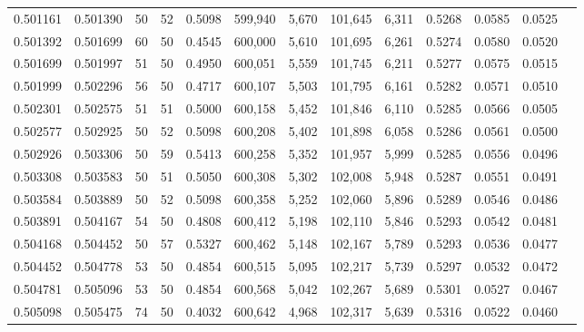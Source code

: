 \begin{tabular}{rrrrrrrrrrrrr}
0.501161 & 0.501390 &    50 &  52 &                                     0.5098 & 599,940 &   5,670 & 101,645 &   6,311 & 0.5268 & 0.0585 & 0.0525 \\
0.501392 & 0.501699 &    60 &  50 &                                     0.4545 & 600,000 &   5,610 & 101,695 &   6,261 & 0.5274 & 0.0580 & 0.0520 \\
0.501699 & 0.501997 &    51 &  50 &                                     0.4950 & 600,051 &   5,559 & 101,745 &   6,211 & 0.5277 & 0.0575 & 0.0515 \\
0.501999 & 0.502296 &    56 &  50 &                                     0.4717 & 600,107 &   5,503 & 101,795 &   6,161 & 0.5282 & 0.0571 & 0.0510 \\
0.502301 & 0.502575 &    51 &  51 &                                     0.5000 & 600,158 &   5,452 & 101,846 &   6,110 & 0.5285 & 0.0566 & 0.0505 \\
0.502577 & 0.502925 &    50 &  52 &                                     0.5098 & 600,208 &   5,402 & 101,898 &   6,058 & 0.5286 & 0.0561 & 0.0500 \\
0.502926 & 0.503306 &    50 &  59 &                                     0.5413 & 600,258 &   5,352 & 101,957 &   5,999 & 0.5285 & 0.0556 & 0.0496 \\
0.503308 & 0.503583 &    50 &  51 &                                     0.5050 & 600,308 &   5,302 & 102,008 &   5,948 & 0.5287 & 0.0551 & 0.0491 \\
0.503584 & 0.503889 &    50 &  52 &                                     0.5098 & 600,358 &   5,252 & 102,060 &   5,896 & 0.5289 & 0.0546 & 0.0486 \\
0.503891 & 0.504167 &    54 &  50 &                                     0.4808 & 600,412 &   5,198 & 102,110 &   5,846 & 0.5293 & 0.0542 & 0.0481 \\
0.504168 & 0.504452 &    50 &  57 &                                     0.5327 & 600,462 &   5,148 & 102,167 &   5,789 & 0.5293 & 0.0536 & 0.0477 \\
0.504452 & 0.504778 &    53 &  50 &                                     0.4854 & 600,515 &   5,095 & 102,217 &   5,739 & 0.5297 & 0.0532 & 0.0472 \\
0.504781 & 0.505096 &    53 &  50 &                                     0.4854 & 600,568 &   5,042 & 102,267 &   5,689 & 0.5301 & 0.0527 & 0.0467 \\
0.505098 & 0.505475 &    74 &  50 &                                     0.4032 & 600,642 &   4,968 & 102,317 &   5,639 & 0.5316 & 0.0522 & 0.0460 \\

\end{tabular}
